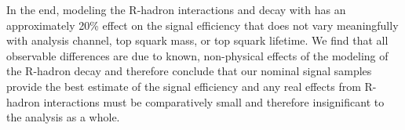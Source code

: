 

In the end, modeling the R-hadron interactions and decay with \GEANTfour has an approximately 20\% effect on the signal efficiency that does not vary meaningfully with analysis channel, top squark mass, or top squark lifetime. We find that all observable differences are due to known, non-physical effects of the modeling of the R-hadron decay and therefore conclude that our nominal signal samples provide the best estimate of the signal efficiency and any real effects from R-hadron interactions must be comparatively small and therefore insignificant to the analysis as a whole.

\pagebreak